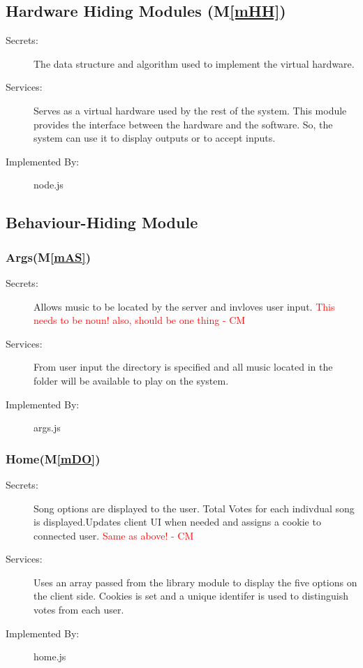 \documentclass[12pt, titlepage]{article}
\newcommand{\mref}[1]{M\ref{#1}}
\begin{document}
\subsection{Hardware Hiding Modules (\mref{mHH})}


\begin{description}
\item[Secrets:]The data structure and algorithm used to implement the virtual
 hardware.
\item[Services:]Serves as a virtual hardware used by the rest of the
 system. This module provides the interface between the hardware and the
 software. So, the system can use it to display outputs or to accept inputs.
\item[Implemented By:] node.js
\end{description}


\subsection{Behaviour-Hiding Module}

\subsubsection{Args(\mref{mAS})}


\begin{description}
\item[Secrets:]Allows music to be located by the server and invloves user input. \textcolor{red}{This needs to be noun! also, should be one thing - CM}
\item[Services:]From user input the directory is specified and all music located in the folder will be available to play on the system.
\item[Implemented By:] args.js
\end{description}

\subsubsection{Home(\mref{mDO})}


\begin{description}
\item[Secrets:]Song options are displayed to the user. Total Votes for each indivdual song is displayed.Updates client UI when needed and assigns a cookie to connected user. \textcolor{red}{Same as above! - CM}
\item[Services:]Uses an array passed from the library module to display the five options on the client side. Cookies is set and a unique identifer is used to distinguish votes from each user.
\item[Implemented By:] home.js
\end{description}
\end{document}
